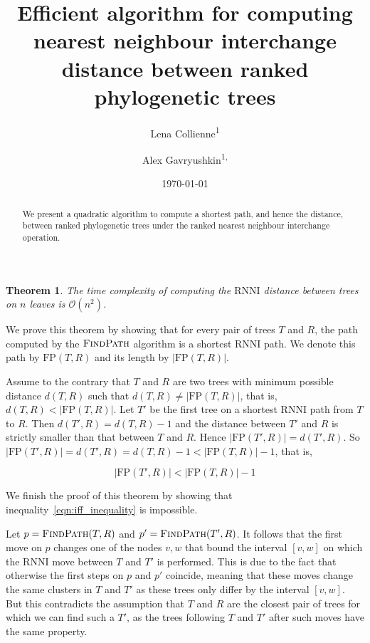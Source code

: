 \documentclass{amsart}
\title[Computing $\rnni$ distance]{Efficient algorithm for computing nearest neighbour interchange distance between ranked phylogenetic trees}
\date{\today}
\author{Lena Collienne\textsuperscript{1}}
\author{Alex Gavryushkin\textsuperscript{1, \Letter}}
\newtheorem{theorem}{Theorem}
\newcommand{\rnni}{\mathrm{RNNI}}
\newcommand{\findpath}{\textsc{FindPath}}
\newcommand{\fp}{\mathrm{FP}}
\renewcommand{\O}{\mathcal O}
\begin{document}
\begin{abstract}
We present a quadratic algorithm to compute a shortest path, and hence the distance, between ranked phylogenetic trees under the ranked nearest neighbour interchange operation.
\end{abstract}


\maketitle

\begin{theorem}
The time complexity of computing the $\rnni$ distance between trees on $n$ leaves is $\O(n^2)$.
\end{theorem}

\proof
We prove this theorem by showing that for every pair of trees $T$ and $R$, the path computed by the $\findpath$ algorithm is a shortest $\rnni$ path.
We denote this path by $\fp(T, R)$ and its length by $|\fp(T, R)|$.

Assume to the contrary that $T$ and $R$ are two trees with minimum possible distance $d(T, R)$ such that $d(T,R) \neq |\fp(T,R)|$, that is, $d(T,R) < |\fp(T,R)|$.
Let $T'$ be the first tree on a shortest $\rnni$ path from $T$ to $R$.
Then $d(T',R) = d(T, R) - 1$ and the distance between $T'$ and $R$ is strictly smaller than that between $T$ and $R$.
Hence $|\fp(T',R)| = d(T', R)$.
So $|\fp(T',R)| = d(T', R) =  d(T, R) - 1 < |\fp(T,R)| - 1$, that is,

\begin{equation}
|\fp(T',R)| < |\fp(T,R)| - 1
\label{eqn:iff_inequality}
\end{equation}

We finish the proof of this theorem by showing that inequality~\ref{eqn:iff_inequality} is impossible.

Let $p = \findpath(T,R)$ and $p' = \findpath(T', R)$.
It follows that the first move on $p$ changes one of the nodes $v, w$ that bound the interval $[v,w]$ on which the $\rnni$ move between $T$ and $T'$ is performed.
This is due to the fact that otherwise the first steps on $p$ and $p'$ coincide, meaning that these moves change the same clusters in $T$ and $T'$ as these trees only differ by the interval $[v,w]$.
But this contradicts the assumption that $T$ and $R$ are the closest pair of trees for which we can find such a $T'$, as the trees following $T$ and $T'$ after such moves have the same property.
\end{document}

